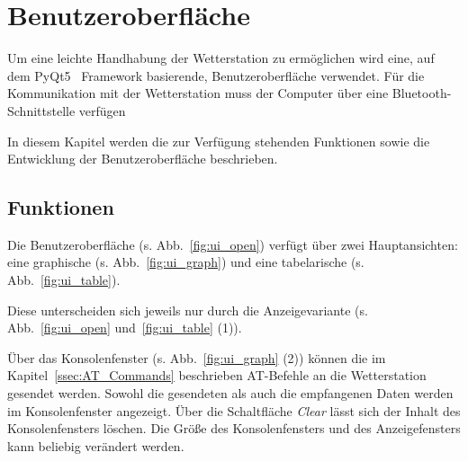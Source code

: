 \section{Benutzeroberfläche}\label{sec:benutzeroberflaeche}
Um eine leichte Handhabung der Wetterstation zu ermöglichen wird eine, auf dem PyQt5~\cite{pyqt5} Framework basierende, Benutzeroberfläche verwendet. Für die Kommunikation mit der Wetterstation muss der Computer über eine Bluetooth-Schnittstelle verfügen

In diesem Kapitel werden die zur Verfügung stehenden Funktionen sowie die Entwicklung der Benutzeroberfläche beschrieben.

\subsection{Funktionen}\label{sec:bo_funktionen}
Die Benutzeroberfläche (s. Abb.~\ref{fig:ui_open}) verfügt über zwei Hauptansichten: eine graphische (s. Abb.~\ref{fig:ui_graph}) und eine tabelarische (s. Abb.~\ref{fig:ui_table}).

Diese unterscheiden sich jeweils nur durch die Anzeigevariante (s. Abb.~\ref{fig:ui_open} und~\ref{fig:ui_table} (1)).

Über das Konsolenfenster (s. Abb.~\ref{fig:ui_graph} (2)) können die im Kapitel~\ref{ssec:AT_Commands} beschrieben AT-Befehle an die Wetterstation gesendet werden. Sowohl die gesendeten als auch die empfangenen Daten werden im Konsolenfenster angezeigt. Über die Schaltfläche \emph{Clear} lässt sich der Inhalt des Konsolenfensters löschen. Die Größe des Konsolenfensters und des Anzeigefensters kann beliebig verändert werden.

